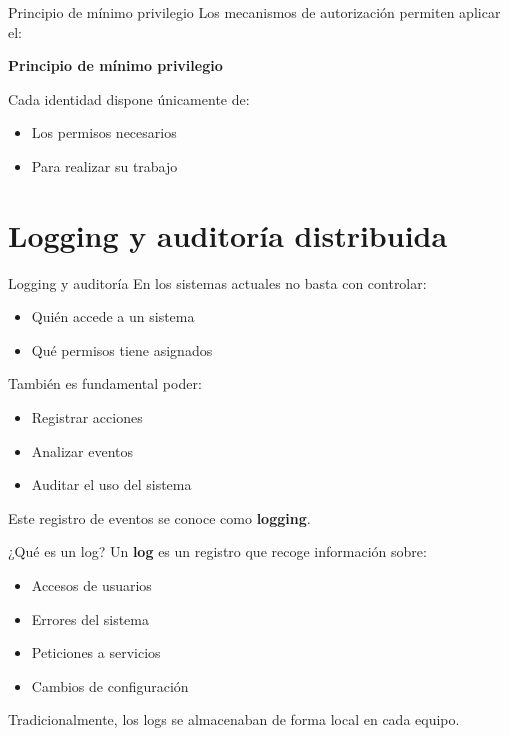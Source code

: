\documentclass{beamer}
\begin{document}
\begin{frame}{Principio de mínimo privilegio}
Los mecanismos de autorización permiten aplicar el:
\begin{center}
\textbf{Principio de mínimo privilegio}
\end{center}

\vspace{0.3cm}
Cada identidad dispone únicamente de:
\begin{itemize}
    \item Los permisos necesarios
    \item Para realizar su trabajo
\end{itemize}
\end{frame}


\section{Logging y auditoría distribuida}

\begin{frame}{Logging y auditoría}
En los sistemas actuales no basta con controlar:
\begin{itemize}
    \item Quién accede a un sistema
    \item Qué permisos tiene asignados
\end{itemize}

\vspace{0.3cm}
También es fundamental poder:
\begin{itemize}
    \item Registrar acciones
    \item Analizar eventos
    \item Auditar el uso del sistema
\end{itemize}

\vspace{0.3cm}
Este registro de eventos se conoce como \textbf{logging}.
\end{frame}

\begin{frame}{¿Qué es un log?}
Un \textbf{log} es un registro que recoge información sobre:
\begin{itemize}
    \item Accesos de usuarios
    \item Errores del sistema
    \item Peticiones a servicios
    \item Cambios de configuración
\end{itemize}

\vspace{0.3cm}
Tradicionalmente, los logs se almacenaban de forma local en cada equipo.
\end{frame}
\end{document}

